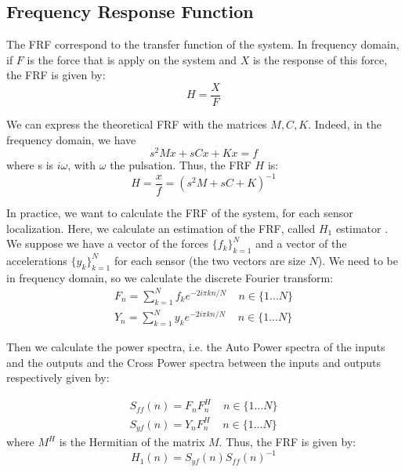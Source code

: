 \documentclass[journal]{IEEEtran}
\begin{document}
\subsection{Frequency Response Function}

The FRF correspond to the transfer function of the system. In frequency domain, if $F$ is the force that is apply on the system and $X$ is the response of this force, the FRF is given by:
\begin{equation}
H = \frac{X}{F}
\end{equation}

We can express the theoretical FRF with the matrices $M, C, K$. Indeed, in the frequency domain, we have
\begin{equation}
s^2 M x + s C x + K x = f
\end{equation}
where s is $i\omega$, with $\omega$ the pulsation.
Thus, the FRF $H$ is:
\begin{equation}
H = \frac{x}{f} = (s^2 M + s C + K)^{-1}
\end{equation}


In practice, we want to calculate the FRF of the system, for each sensor localization. Here, we calculate an estimation of the FRF, called $H_1$ estimator \cite{cauberghe2004applied}. We suppose we have a vector of the forces $\{ f_k\}_{k=1}^N$ and a vector of the accelerations $\{ y_k\}_{k=1}^N$ for each sensor (the two vectors are size $N$). We need to be in frequency domain, so we calculate the discrete Fourier transform:
\begin{equation}
\begin{array}{ll}
F_n = \sum\limits_{k=1}^N f_k e^{-2i\pi kn/N} \ \ \ \ \ n \in \{1 ... N\} \\
Y_n = \sum\limits_{k=1}^N y_k e^{-2i\pi kn/N} \ \ \ \ \ n \in \{1 ... N\}
\end{array}
\end{equation}

Then we calculate the power spectra, i.e. the Auto Power spectra of the inputs and the outputs
and the Cross Power spectra between the inputs and outputs respectively given by:

\begin{equation}
\begin{array}{ll}
S_{ff}(n) = F_n F_n^H \ \ \ \ \ n \in \{1 ... N\} \\
S_{yf}(n) = Y_n F_n^H \ \ \ \ \ n \in \{1 ... N\}
\end{array}
\end{equation}
where $M^H$ is the Hermitian of the matrix $M$. Thus, the FRF is given by:
\begin{equation}
H_1(n) = S_{yf}(n) S_{ff}(n)^{-1}
\end{equation}
\end{document}
